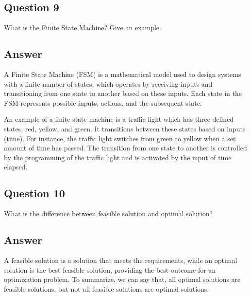 \documentclass[12]{article}
\begin{document}
\subsection*{Question 9}
What is the Finite State Machine? Give an example.
\subsection*{Answer}

A Finite State Machine (FSM) is a mathematical model used to design systems with a finite number of states, which operates by receiving inputs and transitioning from one state to another based on these inputs. Each state in the FSM represents possible inputs, actions, and the subsequent state.

An example of a finite state machine is a traffic light which has three defined states, red, yellow, and green. It transitions between these states based on inputs (time). For instance, the traffic light switches from green to yellow when a set amount of time has passed. The transition from one state to another is controlled by the programming of the traffic light and is activated by the input of time elapsed.

\subsection*{Question 10}
What is the difference between feasible solution and optimal solution?

\subsection*{Answer}

A feasible solution is a solution that meets the requirements, while an optimal solution is the best feasible solution, providing the best outcome for an optimization problem. To summarize, we can say that, all optimal solutions are feasible solutions, but not all feasible solutions are optimal solutions. 

\end{document}
